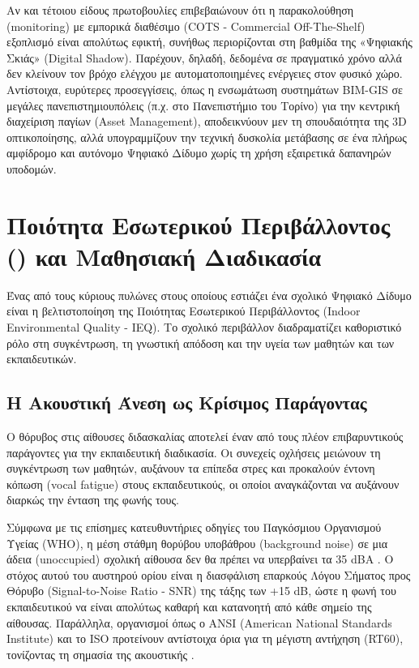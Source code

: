 Αν και τέτοιου είδους πρωτοβουλίες επιβεβαιώνουν ότι η παρακολούθηση (monitoring) με εμπορικά διαθέσιμο (COTS - Commercial Off-The-Shelf) εξοπλισμό είναι απολύτως εφικτή, συνήθως περιορίζονται στη βαθμίδα της «Ψηφιακής Σκιάς» (Digital Shadow). Παρέχουν, δηλαδή, δεδομένα σε πραγματικό χρόνο αλλά δεν κλείνουν τον βρόχο ελέγχου με αυτοματοποιημένες ενέργειες στον φυσικό χώρο. Αντίστοιχα, ευρύτερες προσεγγίσεις, όπως η ενσωμάτωση συστημάτων BIM-GIS σε μεγάλες πανεπιστημιουπόλεις (π.χ. στο Πανεπιστήμιο του Τορίνο) για την κεντρική διαχείριση παγίων (Asset Management), αποδεικνύουν μεν τη σπουδαιότητα της 3D οπτικοποίησης, αλλά υπογραμμίζουν την τεχνική δυσκολία μετάβασης σε ένα πλήρως αμφίδρομο και αυτόνομο Ψηφιακό Δίδυμο χωρίς τη χρήση εξαιρετικά δαπανηρών υποδομών.

\section{Ποιότητα Εσωτερικού Περιβάλλοντος () και Μαθησιακή Διαδικασία}
Ένας από τους κύριους πυλώνες στους οποίους εστιάζει ένα σχολικό Ψηφιακό Δίδυμο είναι η βελτιστοποίηση της Ποιότητας Εσωτερικού Περιβάλλοντος (Indoor Environmental Quality - IEQ). Το σχολικό περιβάλλον διαδραματίζει καθοριστικό ρόλο στη συγκέντρωση, τη γνωστική απόδοση και την υγεία των μαθητών και των εκπαιδευτικών.

\subsection{Η Ακουστική Άνεση ως Κρίσιμος Παράγοντας}
Ο θόρυβος στις αίθουσες διδασκαλίας αποτελεί έναν από τους πλέον επιβαρυντικούς παράγοντες για την εκπαιδευτική διαδικασία. Οι συνεχείς οχλήσεις μειώνουν τη συγκέντρωση των μαθητών, αυξάνουν τα επίπεδα στρες και προκαλούν έντονη κόπωση (vocal fatigue) στους εκπαιδευτικούς, οι οποίοι αναγκάζονται να αυξάνουν διαρκώς την ένταση της φωνής τους.

Σύμφωνα με τις επίσημες κατευθυντήριες οδηγίες του Παγκόσμιου Οργανισμού Υγείας (WHO), η μέση στάθμη θορύβου υποβάθρου (background noise) σε μια άδεια (unoccupied) σχολική αίθουσα δεν θα πρέπει να υπερβαίνει τα 35 dBA \cite{WHO2015, Kephalopoulos2015}. Ο στόχος αυτού του αυστηρού ορίου είναι η διασφάλιση επαρκούς Λόγου Σήματος προς Θόρυβο (Signal-to-Noise Ratio - SNR) της τάξης των +15 dB, ώστε η φωνή του εκπαιδευτικού να είναι απολύτως καθαρή και κατανοητή από κάθε σημείο της αίθουσας. Παράλληλα, οργανισμοί όπως ο ANSI (American National Standards Institute) και το ISO προτείνουν αντίστοιχα όρια για τη μέγιστη αντήχηση (RT60), τονίζοντας τη σημασία της ακουστικής \cite{ANSI2010, ISO2008, Mogas2021}.

